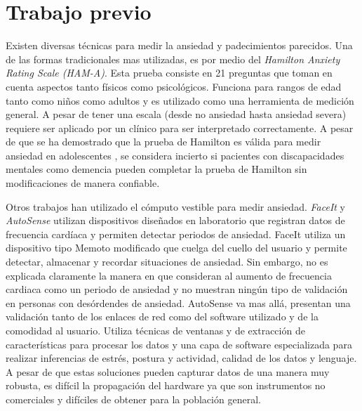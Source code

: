 \documentclass[letterpaper,12pt]{cicese}
\begin{document}
		\chapter{Trabajo previo}
				Existen diversas t\'ecnicas para medir la ansiedad y padecimientos parecidos. Una de las formas tradicionales mas utilizadas, es por medio del \emph{Hamilton Anxiety Rating Scale (HAM-A)}\citep{Hamilton1959}. Esta prueba consiste en 21 preguntas que toman en cuenta aspectos tanto f\'isicos como psicol\'ogicos. Funciona para rangos de edad tanto como ni\~nos como adultos y es utilizado como una herramienta de medici\'on general. A pesar de tener una escala (desde no ansiedad hasta ansiedad severa)  requiere ser aplicado por un cl\'inico para ser interpretado correctamente. A pesar de que se ha demostrado que la prueba de Hamilton es v\'alida para medir ansiedad en adolescentes \citep{CLARK1994354}, se considera incierto si pacientes con discapacidades mentales como demencia pueden completar la prueba de Hamilton sin modificaciones de manera confiable\citep{Bradford2013125}.

				Otros trabajos han utilizado el c\'omputo vestible para medir ansiedad. {\emph{FaceIt}\citep{Rennert2013}} y {\emph{AutoSense}\citep{Ertin2011}} utilizan dispositivos dise\~nados en laboratorio que registran datos de frecuencia card\'iaca y permiten detectar periodos de ansiedad. FaceIt utiliza un dispositivo tipo Memoto modificado que cuelga del cuello del usuario y permite detectar, almacenar y recordar situaciones de ansiedad. Sin embargo, no es explicada claramente la manera en que consideran al aumento de frecuencia cardiaca como un periodo de ansiedad y no muestran ning\'un tipo de validaci\'on en personas con des\'ordendes de ansiedad. AutoSense va mas all\'a, presentan una validaci\'on tanto de los enlaces de red como del software utilizado y de la comodidad al usuario. Utiliza t\'ecnicas de ventanas y de extracci\'on de caracter\'isticas para procesar los datos y una capa de software especializada para realizar inferencias de estr\'es, postura y actividad, calidad de los datos y lenguaje. A pesar de que estas soluciones pueden capturar datos de una manera muy robusta, es dif\'icil la propagaci\'on del hardware ya que son instrumentos no comerciales y dif\'iciles de obtener para la poblaci\'on general.
\end{document}
